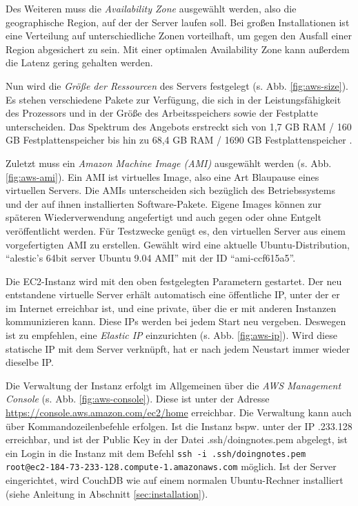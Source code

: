 Des Weiteren muss die \textit{Availability Zone} ausgewählt werden, also die geographische Region, auf der der Server laufen soll. Bei großen Installationen ist eine Verteilung auf unterschiedliche Zonen vorteilhaft, um gegen den Ausfall einer Region abgesichert zu sein. Mit einer optimalen Availability Zone kann außerdem die Latenz gering gehalten werden.

Nun wird die \textit{Größe der Ressourcen} des Servers festgelegt (s. Abb. \ref{fig:aws-size}). Es stehen verschiedene Pakete zur Verfügung, die sich in der Leistungsfähigkeit des Prozessors und in der Größe des Arbeitsspeichers sowie der Festplatte unterscheiden. Das Spektrum des Angebots erstreckt sich von 1,7 GB RAM / 160 GB Festplattenspeicher bis hin zu 68,4 GB RAM / 1690 GB Festplattenspeicher \cite{aws:instances}.

Zuletzt muss ein \textit{Amazon Machine Image (AMI)} ausgewählt werden (s. Abb. \ref{fig:aws-ami}). Ein AMI ist virtuelles Image, also eine Art Blaupause eines virtuellen Servers. Die AMIs unterscheiden sich bezüglich des Betriebssystems und der auf ihnen installierten Software-Pakete. Eigene Images können zur späteren Wiederverwendung angefertigt und auch gegen oder ohne Entgelt veröffentlicht werden. Für Testzwecke genügt es, den virtuellen Server aus einem vorgefertigten AMI zu erstellen. Gewählt wird eine aktuelle Ubuntu-Distribution, \enquote{alestic's 64bit server Ubuntu 9.04 AMI} mit der ID \enquote{ami-ccf615a5}.

Die EC2-Instanz wird mit den oben festgelegten Parametern gestartet. Der neu entstandene virtuelle Server erhält automatisch eine öffentliche IP, unter der er im Internet erreichbar ist, und eine private, über die er mit anderen Instanzen kommunizieren kann. Diese IPs werden bei jedem Start neu vergeben. Deswegen ist zu empfehlen, eine \textit{Elastic IP} einzurichten (s. Abb. \ref{fig:aws-ip}). Wird diese statische IP mit dem Server verknüpft, hat er nach jedem Neustart immer wieder dieselbe IP.

Die Verwaltung der Instanz erfolgt im Allgemeinen über die \textit{AWS Management Console} (s. Abb. \ref{fig:aws-console}). Diese ist unter der Adresse \url{https://console.aws.amazon.com/ec2/home} erreichbar. Die Verwaltung kann auch über Kommandozeilenbefehle erfolgen. Ist die Instanz bspw. unter der IP {.233.128} erreichbar, und ist der Public Key in der Datei {\selectfont .ssh/doingnotes.pem} abgelegt, ist ein Login in die Instanz mit dem Befehl \lstinline!ssh -i .ssh/doingnotes.pem root@ec2-184-73-233-128.compute-1.amazonaws.com! möglich. Ist der Server eingerichtet, wird CouchDB wie auf einem normalen Ubuntu-Rechner installiert (siehe Anleitung in Abschnitt \ref{sec:installation}).

